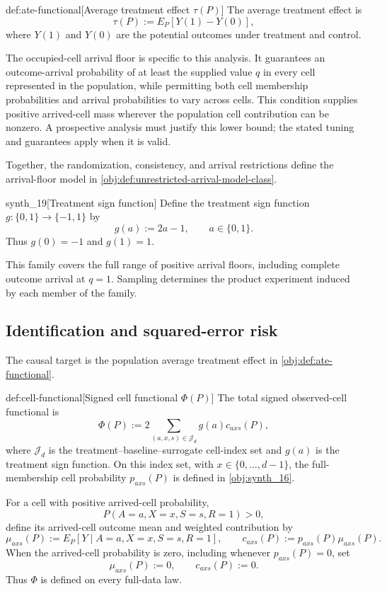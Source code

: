 \documentclass[11pt]{article}
\begin{document}
\begin{definitionv}{def:ate-functional}[Average treatment effect \(\tau(P)\)]
The average treatment effect is
\[
\tau(P):=E_P[Y(1)-Y(0)],
\]
where \(Y(1)\) and \(Y(0)\) are the potential outcomes under treatment and control.
\end{definitionv}

The occupied-cell arrival floor is specific to this analysis. It guarantees an outcome-arrival probability of at least the supplied value \(q\) in every cell represented in the population, while permitting both cell membership probabilities and arrival probabilities to vary across cells. This condition supplies positive arrived-cell mass wherever the population cell contribution can be nonzero. A prospective analysis must justify this lower bound; the stated tuning and guarantees apply when it is valid.

Together, the randomization, consistency, and arrival restrictions define the arrival-floor model  in \cref{obj:def:unrestricted-arrival-model-class}.

\begin{definitionv}{synth_19}[Treatment sign function]
Define the treatment sign function \(g:\{0,1\}\to\{-1,1\}\) by
\[
g(a):=2a-1,\qquad a\in\{0,1\}.
\]
Thus \(g(0)=-1\) and \(g(1)=1\).
\end{definitionv}

This family covers the full range of positive arrival floors, including complete outcome arrival at \(q=1\). Sampling determines the product experiment induced by each member of the family.

\subsection{Identification and squared-error risk}

The causal target is the population average treatment effect  in \cref{obj:def:ate-functional}.

\begin{definitionv}{def:cell-functional}[Signed cell functional \(\Phi(P)\)]
The total signed observed-cell functional is
\[
\Phi(P):=2\sum_{(a,x,s)\in\mathcal J_d}g(a)c_{axs}(P),
\]
where \(\mathcal J_d\) is the treatment–baseline–surrogate cell-index set and \(g(a)\) is the treatment sign function. On this index set, with \(x\in\{0,\ldots,d-1\}\), the full-membership cell probability \(p_{axs}(P)\) is defined in \cref{obj:synth_16}.

For a cell with positive arrived-cell probability,
\[
P(A=a,X=x,S=s,R=1)>0,
\]
define its arrived-cell outcome mean and weighted contribution by
\[
\mu_{axs}(P):=E_P[Y\mid A=a,X=x,S=s,R=1],
\qquad
c_{axs}(P):=p_{axs}(P)\mu_{axs}(P).
\]
When the arrived-cell probability is zero, including whenever \(p_{axs}(P)=0\), set
\[
\mu_{axs}(P):=0,
\qquad
c_{axs}(P):=0.
\]
Thus \(\Phi\) is defined on every full-data law.
\end{definitionv}
\end{document}
